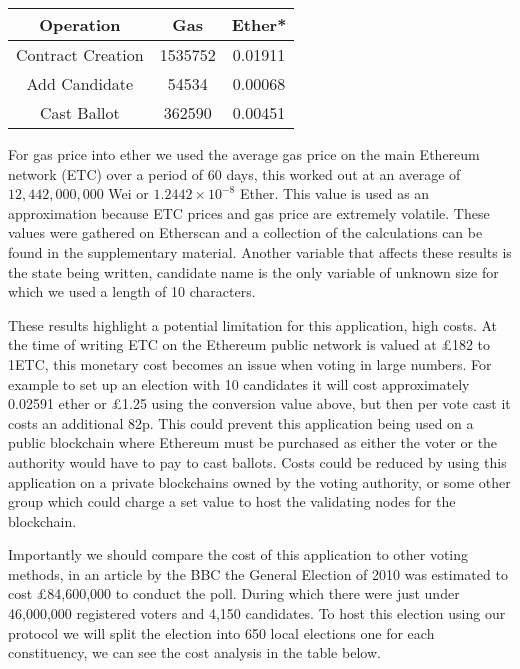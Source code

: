\documentclass{entcs}
\begin{document}
\begin{table}[h!]
\centering
\begin{tabular}{|c c c|}
 \hline
 Operation & Gas & Ether* \\ 
 \hline
 Contract Creation & 1535752 & 0.01911 \\  
 Add Candidate & 54534 & 0.00068 \\  
 Cast Ballot & 362590 & 0.00451 \\  
 \hline
\end{tabular}
\end{table}

For gas price into ether we used the average gas price on the main Ethereum network (ETC) over a period of 60 days, this worked out at an average of \(12,442,000,000\) Wei or \(1.2442 \times 10^{-8}\) Ether. This value is used as an approximation because ETC prices and gas price are extremely volatile. These values were gathered on Etherscan \cite{gasprice} and a collection of the calculations can be found in the supplementary material. Another variable that affects these results is the state being written, candidate name is the only variable of unknown size for which we used a length of 10 characters.

These results highlight a potential limitation for this application, high costs. At the time of writing ETC on the Ethereum public network is valued at £182 to 1ETC, this monetary cost becomes an issue when voting in large numbers. For example to set up an election with 10 candidates it will cost approximately 0.02591 ether or £1.25 using the conversion value above, but then per vote cast it costs an additional 82p. This could prevent this application being used on a public blockchain where Ethereum must be purchased as either the voter or the authority would have to pay to cast ballots. Costs could be reduced by using this application on a private blockchains owned by the voting authority, or some other group which could charge a set value to host the validating nodes for the blockchain. 

Importantly we should compare the cost of this application to other voting methods, in an article by the BBC \cite{costOfGE} the General Election of 2010 was estimated to cost £84,600,000 to conduct the poll. During which there were just under 46,000,000 registered voters and 4,150 candidates. To host this election using our protocol we will split the election into 650 local elections one for each constituency, we can see the cost analysis in the table below.
\end{document}
